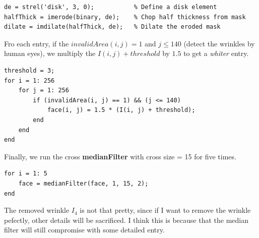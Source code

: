 \documentclass{article}
\newcommand{\tb}{\textbf}
\begin{document}
\begin{lstlisting}
de = strel('disk', 3, 0);           % Define a disk element   
halfThick = imerode(binary, de);    % Chop half thickness from mask
dilate = imdilate(halfThick, de);   % Dilate the eroded mask
\end{lstlisting}

Fro each entry, if the $invalidArea(i, j) = 1$ and $j \le 140$ (detect the wrinkles by human eyes), we multiply the $I(i, j) + threshold$ by $1.5$ to get a \textit{whiter} entry.

\begin{lstlisting}
threshold = 3;
for i = 1: 256
    for j = 1: 256
        if (invalidArea(i, j) == 1) && (j <= 140)
            face(i, j) = 1.5 * (I(i, j) + threshold);
        end
    end
end        
\end{lstlisting}

Finally, we run the cross \tb{medianFilter} with cross size = 15 for five times.

\begin{lstlisting}
for i = 1: 5
    face = medianFilter(face, 1, 15, 2);
end
\end{lstlisting}

The removed wrinkle $I_4$ is not that pretty, since if I want to remove the wrinkle pefectly, other details will be sacrificed. I think this is because that the median filter will still compromise with some detailed entry.
\end{document}
